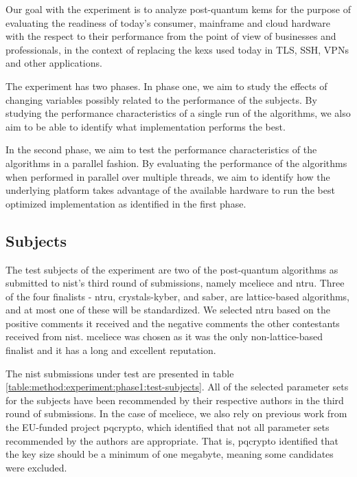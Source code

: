 Our goal with the experiment is to analyze \gls{post-quantum} \glspl{kem} for the purpose of evaluating the readiness of today's consumer, mainframe and cloud hardware with the respect to their performance from the point of view of businesses and professionals, in the context of replacing the \glspl{kex} used today in TLS, SSH, VPNs and other applications.

The experiment has two phases. In phase one, we aim to study the effects of changing variables possibly related to the performance of the subjects. By studying the performance characteristics of a single run of the algorithms, we also aim to be able to identify what implementation performs the best.

In the second phase, we aim to test the performance characteristics of the algorithms in a parallel fashion. By evaluating the performance of the algorithms when performed in parallel over multiple threads, we aim to identify how the underlying platform takes advantage of the available hardware to run the best optimized implementation as identified in the first phase.

\subsection{Subjects}
\label{section:method:experiment:subjects}

The test subjects of the experiment are two of the post-quantum algorithms as submitted to \gls{nist}'s third round of submissions, namely \gls{mceliece} and \gls{ntru}. Three of the four finalists - \gls{ntru}, \gls{crystals-kyber}, and \gls{saber}, are lattice-based algorithms, and at most one of these will be standardized. We selected \gls{ntru} based on the positive comments it received and the negative comments the other contestants received from \gls{nist}. \gls{mceliece} was chosen as it was the only non-lattice-based finalist and it has a long and excellent reputation\cite{nist2020}.

The \gls{nist} submissions under test are presented in table \ref{table:method:experiment:phase1:test-subjects}. All of the selected parameter sets for the subjects have been recommended by their respective authors in the third round of submissions. In the case of \gls{mceliece}, we also rely on previous work from the EU-funded project \gls{pqcrypto}, which identified that not all parameter sets recommended by the authors are appropriate. That is, \gls{pqcrypto} identified that the key size should be a minimum of one megabyte, meaning some candidates were excluded\cite{eu2015}.

